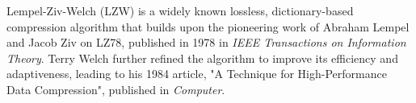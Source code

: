 Lempel-Ziv-Welch (LZW) is a widely known lossless, dictionary-based compression algorithm that builds upon the pioneering work of Abraham Lempel and Jacob Ziv on LZ78, published in 1978 in \textit{IEEE Transactions on Information Theory}\cite{doc1}. Terry Welch further refined the algorithm to improve its efficiency and adaptiveness, leading to his 1984 article, "A Technique for High-Performance Data Compression"\cite{doc2}, published in \textit{Computer}.

    
    
    


 

